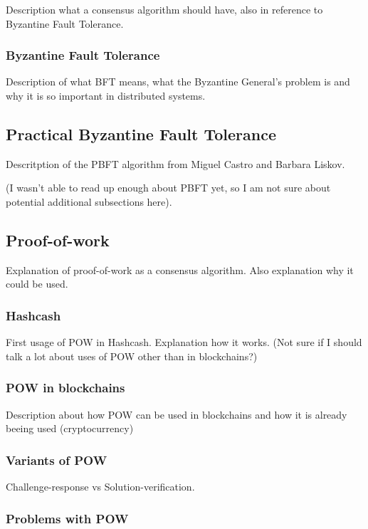\documentclass{acm_proc_article-sp}
\begin{document}
Description what a consensus algorithm should have, also in reference to Byzantine Fault Tolerance.


\subsubsection{Byzantine Fault Tolerance}

Description of what BFT means, what the Byzantine General's problem is and why it is so important in distributed systems.


\subsection{Practical Byzantine Fault Tolerance}

Descritption of the PBFT algorithm from Miguel Castro and Barbara Liskov.

(I wasn't able to read up enough about PBFT yet, so I am not sure about potential additional subsections here).


\subsection{Proof-of-work}

Explanation of proof-of-work as a consensus algorithm. Also explanation why it could be used.


\subsubsection{Hashcash}

First usage of POW in Hashcash. Explanation how it works. (Not sure if I should talk a lot about uses of POW other than in blockchains?)


\subsubsection{POW in blockchains}

Description about how POW can be used in blockchains and how it is already beeing used (cryptocurrency)


\subsubsection{Variants of POW}

Challenge-response vs Solution-verification.


\subsubsection{Problems with POW}
\end{document}

